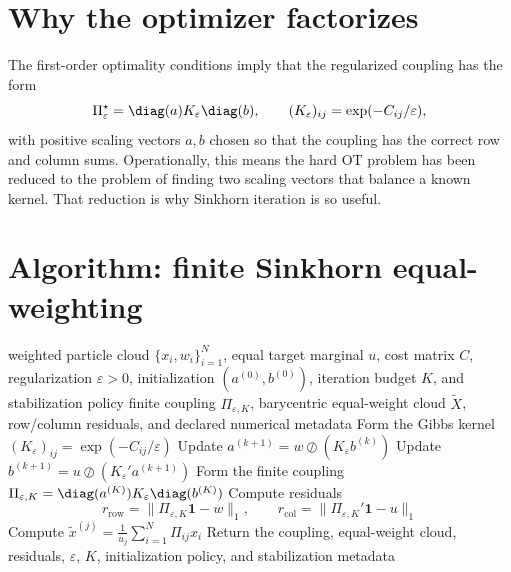 \section{Why the optimizer factorizes}
\label{sec:bf-eot-factorization}

The first-order optimality conditions imply that the regularized coupling has the
form
\begin{equation}
\label{eq:bf-eot-factorization}
  \Pi_\varepsilon^\star
  =
  \diag(a)K_\varepsilon\diag(b),
  \qquad
  (K_\varepsilon)_{ij}=\exp(-C_{ij}/\varepsilon),
\end{equation}
with positive scaling vectors \(a,b\) chosen so that the coupling has the correct
row and column sums.  Operationally, this means the hard OT problem has been
reduced to the problem of finding two scaling vectors that balance a known kernel.
That reduction is why Sinkhorn iteration is so useful.

\section{Algorithm: finite Sinkhorn equal-weighting}
\label{sec:bf-eot-algorithm}

\begin{algorithm}[ht]
\caption{\texttt{sinkhorn\_equalweight\_step}}
\begin{algorithmic}[1]
\Require weighted particle cloud \(\{x_i,w_i\}_{i=1}^N\), equal target marginal \(u\), cost matrix \(C\), regularization \(\varepsilon>0\), initialization \((a^{(0)},b^{(0)})\), iteration budget \(K\), and stabilization policy
\Ensure finite coupling \(\Pi_{\varepsilon,K}\), barycentric equal-weight cloud \(\widetilde X\), row/column residuals, and declared numerical metadata
\State Form the Gibbs kernel \((K_\varepsilon)_{ij}=\exp(-C_{ij}/\varepsilon)\)
  \State Update \(a^{(k+1)} = w \oslash (K_\varepsilon b^{(k)})\)
  \State Update \(b^{(k+1)} = u \oslash (K_\varepsilon' a^{(k+1)})\)
\EndFor
\State Form the finite coupling \(\Pi_{\varepsilon,K}=\diag(a^{(K)})K_\varepsilon\diag(b^{(K)})\)
\State Compute residuals
\[
  r_{\mathrm{row}}=\|\Pi_{\varepsilon,K}\mathbf 1-w\|_1,
  \qquad
  r_{\mathrm{col}}=\|\Pi_{\varepsilon,K}'\mathbf 1-u\|_1
\]
  \State Compute \(\tilde x^{(j)} = \frac{1}{u_j}\sum_{i=1}^N \Pi_{ij}x_i\)
\EndFor
\State Return the coupling, equal-weight cloud, residuals, \(\varepsilon\), \(K\), initialization policy, and stabilization metadata
\end{algorithmic}
\end{algorithm}

